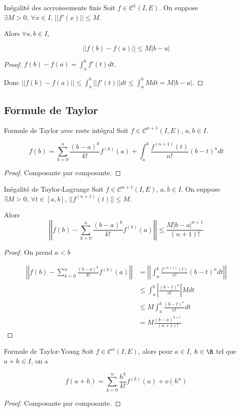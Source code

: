 \begin{theoreme}{Inégalité des accroissements finis}{}
    Soit $f \in \mathscr C^1(I, E)$. On suppose $\exists M > 0, \, \forall x \in I, \, ||f'(x)|| \leqslant M$.

    Alors $\forall a, b \in I$, 

    $$||f(b) - f(a)|| \leqslant M |b - a|$$
\end{theoreme}


\begin{proof}

    $f(b) - f(a) = \int_a^b f'(t) dt$.

    Donc $\displaystyle ||f(b) - f(a)|| \leqslant \int_a^b ||f'(t)|| dt \leqslant \int_a^b M dt = M |b - a|$.
\end{proof}


\subsection{Formule de Taylor }

\begin{proposition}{Formule de Taylor avec reste intégral}{}
    Soit $f \in \mathscr C^{n + 1}(I, E)$, $a, b \in I$. 

    $$f(b) = \sum_{k = 0 }^{n } \frac{(b - a)^k}{k!} f^{(k)}(a) + \int_a^b \frac{f^{(n + 1)}(t)}{n!} (b - t)^n dt$$
\end{proposition}

\begin{proof}
    Composante par composante.
\end{proof}

\begin{proposition}{Inégalité de Taylor-Lagrange}{}
    Soit $f \in \mathscr C^{n + 1}(I, E)$, $a, b \in I$. On suppose $\exists M > 0, \, \forall t \in [a, b], \, ||f^{(n + 1)}(t)|| \leqslant M$.

    Alors $$\left|\left| f(b) - \sum_{k = 0 }^{n } \frac{(b - a)^k}{k!} f^{(k)}(a) \right|\right| \leqslant \frac{M |b - a|^{n + 1}}{(n + 1)!}$$
\end{proposition}

\begin{proof}
    On prend $a < b$

    \begin{align*}
    \left|\left| f(b) - \sum_{k = 0}^n \frac{(b - a)^k}{k!} f^{(k)}(a) \right|\right|  & = \left|\left| \int_a^b \frac{f^{(n + 1)}(t)}{n!} (b - t)^n dt \right|\right| \\
     & \leqslant \int_a^b \left| \frac{(b - t)^n}{n!} \right| M dt \\
        & \leqslant M \int_{a }^{b } \frac{(b - t)^n}{n!} dt \\
        & = M \frac{(b - a )^{n + 1}}{(n+ 1)!}
    \end{align*}
\end{proof}

\begin{proposition}{Formule de Taylor-Young}{}
    Soit $f \in \mathscr C^n(I, E)$, alors pour $a \in I$, $h \in \R$ tel que $a + h \in I$, on a

    $$f(a + h) = \sum_{k = 0 }^{n } \frac{h^k}{k!} f^{(k)}(a) + o(h^n)$$
\end{proposition}

\begin{proof}
    Composante par composante.
\end{proof}




